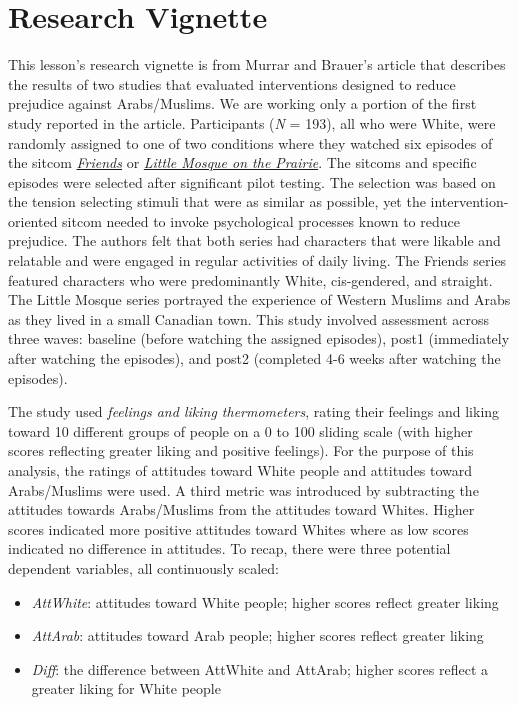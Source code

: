 \documentclass[
  11pt,
]{book}
\providecommand{\tightlist}{%
  \setlength{\itemsep}{0pt}\setlength{\parskip}{0pt}}
\begin{document}
\hypertarget{research-vignette-7}{%
\section{Research Vignette}\label{research-vignette-7}}

This lesson's research vignette is from Murrar and Brauer's \citeyearpar{murrar_entertainment-education_2018} article that describes the results of two studies that evaluated interventions designed to reduce prejudice against Arabs/Muslims. We are working only a portion of the first study reported in the article. Participants (\emph{N} = 193), all who were White, were randomly assigned to one of two conditions where they watched six episodes of the sitcom \href{http://www.friends-tv.org/}{\emph{Friends}} or \href{https://en.wikipedia.org/wiki/Little_Mosque_on_the_Prairie}{\emph{Little Mosque on the Prairie}}. The sitcoms and specific episodes were selected after significant pilot testing. The selection was based on the tension selecting stimuli that were as similar as possible, yet the intervention-oriented sitcom needed to invoke psychological processes known to reduce prejudice. The authors felt that both series had characters that were likable and relatable and were engaged in regular activities of daily living. The Friends series featured characters who were predominantly White, cis-gendered, and straight. The Little Mosque series portrayed the experience of Western Muslims and Arabs as they lived in a small Canadian town. This study involved assessment across three waves: baseline (before watching the assigned episodes), post1 (immediately after watching the episodes), and post2 (completed 4-6 weeks after watching the episodes).

The study used \emph{feelings and liking thermometers}, rating their feelings and liking toward 10 different groups of people on a 0 to 100 sliding scale (with higher scores reflecting greater liking and positive feelings). For the purpose of this analysis, the ratings of attitudes toward White people and attitudes toward Arabs/Muslims were used. A third metric was introduced by subtracting the attitudes towards Arabs/Muslims from the attitudes toward Whites. Higher scores indicated more positive attitudes toward Whites where as low scores indicated no difference in attitudes. To recap, there were three potential dependent variables, all continuously scaled:

\begin{itemize}
\tightlist
\item
  \emph{AttWhite}: attitudes toward White people; higher scores reflect greater liking
\item
  \emph{AttArab}: attitudes toward Arab people; higher scores reflect greater liking
\item
  \emph{Diff}: the difference between AttWhite and AttArab; higher scores reflect a greater liking for White people
\end{itemize}
\end{document}
